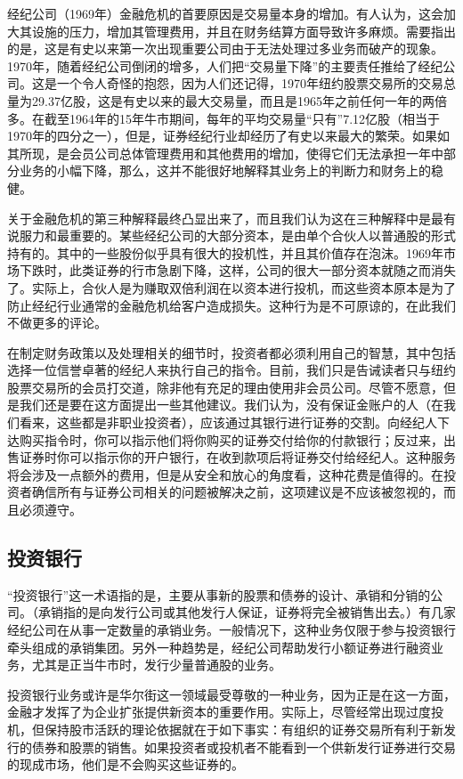 \documentclass[12pt,oneside]{book}
\begin{document}
经纪公司（1969年）金融危机的首要原因是交易量本身的增加。有人认为，这会加大其设施的压力，增加其管理费用，并且在财务结算方面导致许多麻烦。需要指出的是，这是有史以来第一次出现重要公司由于无法处理过多业务而破产的现象。1970年，随着经纪公司倒闭的增多，人们把“交易量下降”的主要责任推给了经纪公司。这是一个令人奇怪的抱怨，因为人们还记得，1970年纽约股票交易所的交易总量为29.37亿股，这是有史以来的最大交易量，而且是1965年之前任何一年的两倍多。在截至1964年的15年牛市期间，每年的平均交易量“只有”7.12亿股（相当于1970年的四分之一），但是，证券经纪行业却经历了有史以来最大的繁荣。如果如其所现，是会员公司总体管理费用和其他费用的增加，使得它们无法承担一年中部分业务的小幅下降，那么，这并不能很好地解释其业务上的判断力和财务上的稳健。

关于金融危机的第三种解释最终凸显出来了，而且我们认为这在三种解释中是最有说服力和最重要的。某些经纪公司的大部分资本，是由单个合伙人以普通股的形式持有的。其中的一些股份似乎具有很大的投机性，并且其价值存在泡沫。1969年市场下跌时，此类证券的行市急剧下降，这样，公司的很大一部分资本就随之而消失了。实际上，合伙人是为赚取双倍利润在以资本进行投机，而这些资本原本是为了防止经纪行业通常的金融危机给客户造成损失。这种行为是不可原谅的，在此我们不做更多的评论。

在制定财务政策以及处理相关的细节时，投资者都必须利用自己的智慧，其中包括选择一位信誉卓著的经纪人来执行自己的指令。目前，我们只是告诫读者只与纽约股票交易所的会员打交道，除非他有充足的理由使用非会员公司。尽管不愿意，但是我们还是要在这方面提出一些其他建议。我们认为，没有保证金账户的人（在我们看来，这些都是非职业投资者），应该通过其银行进行证券的交割。向经纪人下达购买指令时，你可以指示他们将你购买的证券交付给你的付款银行；反过来，出售证券时你可以指示你的开户银行，在收到款项后将证券交付给经纪人。这种服务将会涉及一点额外的费用，但是从安全和放心的角度看，这种花费是值得的。在投资者确信所有与证券公司相关的问题被解决之前，这项建议是不应该被忽视的，而且必须遵守。

\subsection{投资银行}
“投资银行”这一术语指的是，主要从事新的股票和债券的设计、承销和分销的公司。（承销指的是向发行公司或其他发行人保证，证券将完全被销售出去。）有几家经纪公司在从事一定数量的承销业务。一般情况下，这种业务仅限于参与投资银行牵头组成的承销集团。另外一种趋势是，经纪公司帮助发行小额证券进行融资业务，尤其是正当牛市时，发行少量普通股的业务。

投资银行业务或许是华尔街这一领域最受尊敬的一种业务，因为正是在这一方面，金融才发挥了为企业扩张提供新资本的重要作用。实际上，尽管经常出现过度投机，但保持股市活跃的理论依据就在于如下事实：有组织的证券交易所有利于新发行的债券和股票的销售。如果投资者或投机者不能看到一个供新发行证券进行交易的现成市场，他们是不会购买这些证券的。
\end{document}
